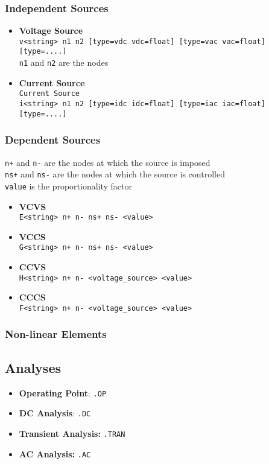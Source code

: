 \subsubsection*{Independent Sources}
\begin{itemize}
    \item \textbf{Voltage Source}\\
        \texttt{v<string> n1 n2 [type=vdc vdc=float] [type=vac vac=float] [type=....]}\\
        \texttt{n1} and \texttt{n2} are the nodes\\
    \item \textbf{Current Source}\\
        \texttt{Current Source}\\
        \texttt{i<string> n1 n2 [type=idc idc=float] [type=iac iac=float] [type=....]}
\end{itemize}
\subsubsection*{Dependent Sources}
\texttt{n+} and \texttt{n-} are the nodes at which the source is imposed\\
\texttt{ns+} and \texttt{ns-} are the nodes at which the source is controlled\\
\texttt{value} is the proportionality factor

\begin{itemize}
    \item \textbf{VCVS}\\
    \texttt{E<string> n+ n- ns+ ns- <value>}
    
    \item \textbf{VCCS}\\
    \texttt{G<string> n+ n- ns+ ns- <value>}
    
    \item \textbf{CCVS}\\
    \texttt{H<string> n+ n- <voltage\_source> <value>}
    \item \textbf{CCCS}\\
    \texttt{F<string> n+ n- <voltage\_source> <value>}
\end{itemize}

\subsubsection*{Non-linear Elements}

\subsection*{Analyses}
\begin{itemize}
    \item \textbf{Operating Point}: \texttt{.OP}
    \item \textbf{DC Analysis}: \texttt{.DC}
    \item \textbf{Transient Analysis:} \texttt{.TRAN}
    \item \textbf{AC Analysis:} \texttt{.AC}
\end{itemize}

